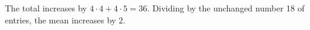 The total increases by $4\cdot4+4\cdot5=36$. Dividing by the unchanged number 18 of entries, the mean increases by $\boxed2$.
